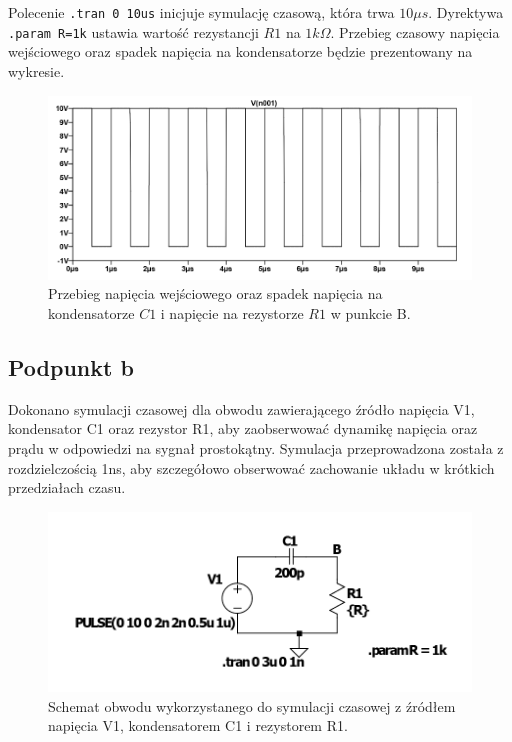 \documentclass[10pt]{article}
\begin{document}
	Polecenie \texttt{.tran 0 10us} inicjuje symulację czasową, która trwa \(10 \mu s\). Dyrektywa \texttt{.param R=1k} ustawia wartość rezystancji \(R1\) na \(1 k\Omega\). Przebieg czasowy napięcia wejściowego oraz spadek napięcia na kondensatorze będzie prezentowany na wykresie.
	
	\begin{figure}[H]
		\centering
		\includegraphics[width=\linewidth]{3awykres.png}
		\caption{Przebieg napięcia wejściowego oraz spadek napięcia na kondensatorze \(C1\) i napięcie na rezystorze \(R1\) w punkcie B.}
		\label{fig:3awykres}
	\end{figure}
	
	
	\pagebreak
	\subsection*{Podpunkt b}
	Dokonano symulacji czasowej dla obwodu zawierającego źródło napięcia V1, kondensator C1 oraz rezystor R1, aby zaobserwować dynamikę napięcia oraz prądu w odpowiedzi na sygnał prostokątny. Symulacja przeprowadzona została z rozdzielczością 1ns, aby szczegółowo obserwować zachowanie układu w krótkich przedziałach czasu.
	
	\begin{figure}[H]
		\centering
		\includegraphics[width=0.8\linewidth]{3bobwod}
		\caption{Schemat obwodu wykorzystanego do symulacji czasowej z źródłem napięcia V1, kondensatorem C1 i rezystorem R1.}
		\label{fig:3bobwod}
	\end{figure}
	
\end{document}
